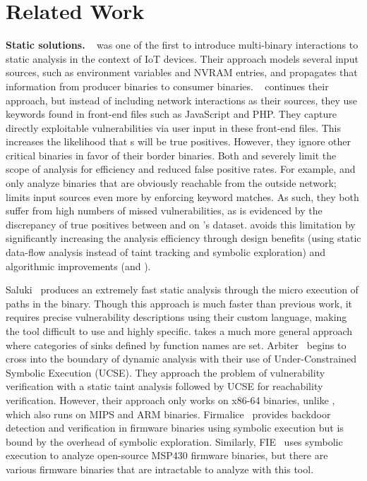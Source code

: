 \section{Related Work}
\label{sec:related}


\noindent
\textbf{Static solutions.}
\karonte~\cite{karonte} was one of the first to introduce multi-binary interactions to static analysis in the context of IoT devices.
Their approach models several input sources, such as environment variables and NVRAM entries, and propagates that information from producer binaries to consumer binaries.
\satc~\cite{SaTC} continues their approach, but instead of including network interactions as their sources, they use keywords found in front-end files such as JavaScript and PHP.
They capture directly exploitable vulnerabilities via user input in these front-end files.
This increases the likelihood that \trupoc{}s will be true positives. 
However, they ignore other critical binaries in favor of their border binaries.
Both \karonte and \satc severely limit the scope of analysis for efficiency and reduced false positive rates.
For example, \karonte and \satc only analyze binaries that are obviously reachable from the outside network; \satc limits input sources even more by enforcing keyword matches.
As such, they both suffer from high numbers of missed vulnerabilities, as is evidenced by the discrepancy of true positives between \mango and \satc on \karonte's dataset.
\mango avoids this limitation by significantly increasing the analysis efficiency through design benefits (using static data-flow analysis instead of taint tracking and symbolic exploration) and algorithmic improvements (\rev and \assumed).

Saluki~\cite{gotovchits2018saluki} produces an extremely fast static analysis through the micro execution of paths in the binary.
Though this approach is much faster than previous work, it requires precise vulnerability descriptions using their custom language, making the tool difficult to use and highly specific.
\mango takes a much more general approach where categories of sinks defined by function names are set.
Arbiter~\cite{arbiter} begins to cross into the boundary of dynamic analysis with their use of Under-Constrained Symbolic Execution (UCSE).
They approach the problem of vulnerability verification with a static taint analysis followed by UCSE for reachability verification.
However, their approach only works on x86-64 binaries, unlike \mango, which also runs on MIPS and ARM binaries.
Firmalice~\cite{firmalice} provides backdoor detection and verification in firmware binaries using symbolic execution but is bound by the overhead of symbolic exploration.
Similarly, FIE~\cite{fie} uses symbolic execution to analyze open-source MSP430 firmware binaries, but there are various firmware binaries that are intractable to analyze with this tool.

